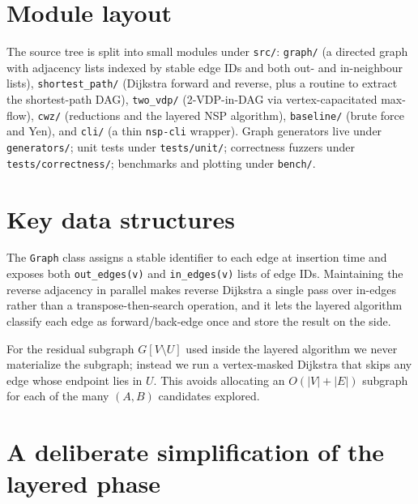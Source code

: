 \section{Module layout}

The source tree is split into small modules under \texttt{src/}:
\texttt{graph/} (a directed graph with adjacency lists indexed by stable edge
IDs and both out- and in-neighbour lists), \texttt{shortest\_path/}
(Dijkstra forward and reverse, plus a routine to extract the
shortest-path DAG), \texttt{two\_vdp/} (2-VDP-in-DAG via vertex-capacitated
max-flow), \texttt{cwz/} (reductions and the layered NSP algorithm),
\texttt{baseline/} (brute force and Yen), and \texttt{cli/} (a thin
\texttt{nsp-cli} wrapper). Graph generators live under \texttt{generators/};
unit tests under \texttt{tests/unit/}; correctness fuzzers under
\texttt{tests/correctness/}; benchmarks and plotting under \texttt{bench/}.

\section{Key data structures}

The \texttt{Graph} class assigns a stable identifier to each edge at insertion
time and exposes both \texttt{out\_edges(v)} and \texttt{in\_edges(v)} lists
of edge IDs. Maintaining the reverse adjacency in parallel makes reverse
Dijkstra a single pass over in-edges rather than a transpose-then-search
operation, and it lets the layered algorithm classify each edge as
forward/back-edge once and store the result on the side.

For the residual subgraph $G[V\setminus U]$ used inside the layered
algorithm we never materialize the subgraph; instead we run a vertex-masked
Dijkstra that skips any edge whose endpoint lies in $U$. This avoids
allocating an $O(|V|+|E|)$ subgraph for each of the many $(A,B)$ candidates
explored.

\section{A deliberate simplification of the layered phase}
\label{sec:simplification}

